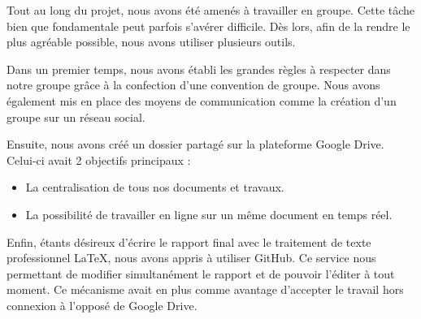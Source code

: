 Tout au long du projet, nous avons été amenés à travailler en groupe. Cette tâche bien que fondamentale peut parfois s'avérer difficile. Dès lors, afin de la rendre le plus agréable possible, nous avons utiliser plusieurs outils.

Dans un premier temps, nous avons établi les grandes règles à respecter dans notre groupe grâce à la confection d'une convention de groupe. Nous avons également mis en place des moyens de communication comme la création d'un groupe sur un réseau social. 

Ensuite, nous avons créé un dossier partagé sur la plateforme Google Drive. Celui-ci avait 2 objectifs principaux :
\begin{itemize}
\item La centralisation de tous nos documents et travaux.
\item La possibilité de travailler en ligne sur un même document en temps réel.
\end{itemize}

Enfin, étants désireux d'écrire le rapport final avec le traitement de texte professionnel \LaTeX, nous avons appris à utiliser GitHub. Ce service nous permettant de modifier simultanément le rapport et de pouvoir l'éditer à tout moment. Ce mécanisme avait en plus comme avantage d'accepter le travail hors connexion à l'opposé de Google Drive.
